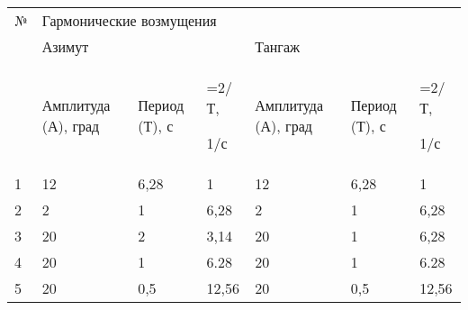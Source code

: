 \begin{table}[h]
	\centering
	\begin{tabular}{p{0.23in}p{0.99in}p{0.82in}p{0.62in}p{0.18in}p{0.62in}p{0.16in}p{0.49in}p{0.7in}}
		\hline
		\multicolumn{1}{|p{0.23in}}{№} & 
		\multicolumn{8}{|p{5.87in}|}{Гармонические возмущения} \\

		\multicolumn{1}{|p{0.23in}}{} & 
		\multicolumn{3}{|p{2.72in}}{Азимут} & 
		\multicolumn{5}{|p{2.95in}|}{Тангаж} \\

		\multicolumn{1}{|p{0.23in}}{} & 
		\multicolumn{1}{|p{0.99in}}{Амплитуда (А), град} & 
		\multicolumn{1}{|p{0.82in}}{Период (Т), с} & 
		\multicolumn{1}{|p{0.62in}}{=2/Т, \par 1/с} & 
		\multicolumn{2}{|p{1.0in}}{Амплитуда (А), град} & 
		\multicolumn{2}{|p{0.85in}}{Период (Т), с} & 
		\multicolumn{1}{|p{0.7in}|}{=2/Т, \par 1/с} \\

		\multicolumn{1}{|p{0.23in}}{1} & 
		\multicolumn{1}{|p{0.99in}}{12} & 
		\multicolumn{1}{|p{0.82in}}{6,28} & 
		\multicolumn{1}{|p{0.62in}}{1} & 
		\multicolumn{2}{|p{1.0in}}{12} & 
		\multicolumn{2}{|p{0.85in}}{6,28} & 
		\multicolumn{1}{|p{0.7in}|}{1} \\

		\multicolumn{1}{|p{0.23in}}{2} & 
		\multicolumn{1}{|p{0.99in}}{2} & 
		\multicolumn{1}{|p{0.82in}}{1} & 
		\multicolumn{1}{|p{0.62in}}{6,28} & 
		\multicolumn{2}{|p{1.0in}}{2} & 
		\multicolumn{2}{|p{0.85in}}{1} & 
		\multicolumn{1}{|p{0.7in}|}{6,28} \\

		\multicolumn{1}{|p{0.23in}}{3} & 
		\multicolumn{1}{|p{0.99in}}{20} & 
		\multicolumn{1}{|p{0.82in}}{2} & 
		\multicolumn{1}{|p{0.62in}}{3,14} & 
		\multicolumn{2}{|p{1.0in}}{20} & 
		\multicolumn{2}{|p{0.85in}}{1} & 
		\multicolumn{1}{|p{0.7in}|}{6,28} \\

		\multicolumn{1}{|p{0.23in}}{4} & 
		\multicolumn{1}{|p{0.99in}}{20} & 
		\multicolumn{1}{|p{0.82in}}{1} & 
		\multicolumn{1}{|p{0.62in}}{6.28} & 
		\multicolumn{2}{|p{1.0in}}{20} & 
		\multicolumn{2}{|p{0.85in}}{1} & 
		\multicolumn{1}{|p{0.7in}|}{6.28} \\

		\multicolumn{1}{|p{0.23in}}{5} & 
		\multicolumn{1}{|p{0.99in}}{20} & 
		\multicolumn{1}{|p{0.82in}}{0,5} & 
		\multicolumn{1}{|p{0.62in}}{12,56} & 
		\multicolumn{2}{|p{1.0in}}{20} & 
		\multicolumn{2}{|p{0.85in}}{0,5} & 
		\multicolumn{1}{|p{0.7in}|}{12,56} \\


\end{tabular}
\end{table}
